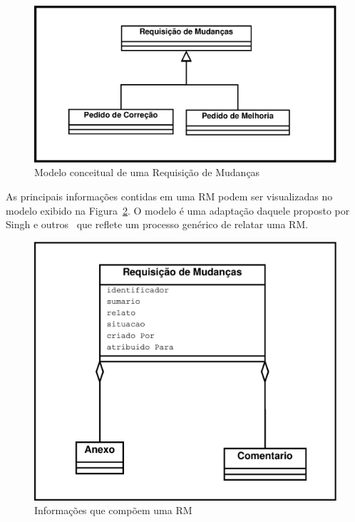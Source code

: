 \begin{figure}[htpb]
	\centering
	\includegraphics[width=0.8\linewidth]{./chapter-manutencao-software-visao-geral/img/diagrama-classe-conceitual-requisicao-mudancas.pdf}
	\caption{Modelo conceitual de uma Requisição de Mudanças}
	\label{fig:diagrama-classe-requisicao-mudancas}
\end{figure}
\todoend

As principais informações contidas em uma RM podem ser visualizadas no modelo
exibido na Figura~\ref{fig:diagrama-classe-atributos-requisicao-mudancas}. O
modelo é uma adaptação daquele proposto por Singh e outros~\cite{singh2011bug}
que reflete um processo genérico de relatar uma RM.

\begin{figure}[htpb]
	\centering
	\includegraphics[width=0.8\linewidth]{./chapter-manutencao-software-visao-geral/img/diagrama-classe-atributos-requisicao-mudancas.pdf}
	\caption{Informações que compõem uma RM}
	\label{fig:diagrama-classe-atributos-requisicao-mudancas}
\end{figure}

